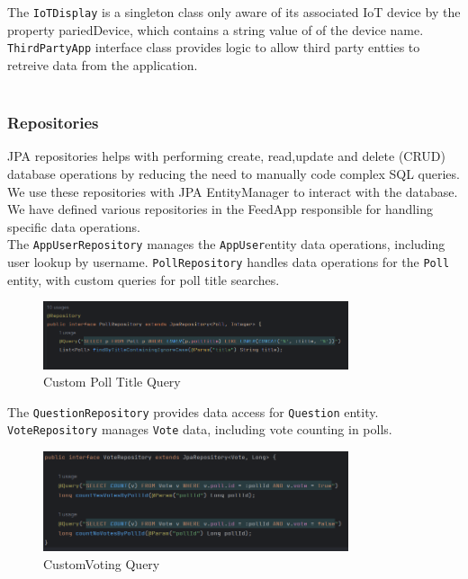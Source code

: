 \noindent The \texttt{IoTDisplay} is a singleton class only aware of its associated IoT device by the property pariedDevice, which contains a string value of of the device name. \\

\noindent \texttt{ThirdPartyApp} interface class provides logic to allow third party entties to retreive data from the application. \\ \\


\subsubsection{Repositories}
JPA repositories helps with performing create, read,update and delete (CRUD) database operations by reducing the need to manually code complex SQL queries.  We use these repositories with JPA EntityManager to interact with the database. We have defined various repositories in the FeedApp responsible for handling specific data operations.\\

\noindent The \texttt{AppUserRepository} manages the \texttt{AppUser}entity data operations, including user lookup by username.
\noindent \texttt{PollRepository} handles data operations for the \texttt{Poll} entity, with custom queries for poll title searches.\\

\begin{figure}[h]
  \centering
  \includegraphics[width=0.80\textwidth]{figs/poll_repository.png}
  \caption{Custom Poll Title Query}
  \label{fig:my_label}
\end{figure}

\noindent The \texttt{QuestionRepository} provides data access for \texttt{Question} entity.
\noindent \texttt {VoteRepository} manages \texttt{Vote} data, including vote counting in polls.

\begin{figure}[h]
  \centering
  \includegraphics[width=0.80\textwidth]{figs/vote_repository.png}
  \caption{CustomVoting Query}
  \label{fig:my_label}
\end{figure}

